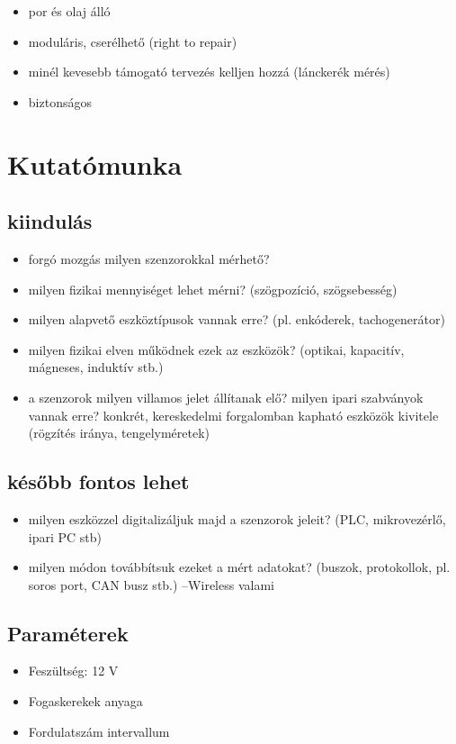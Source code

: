 \documentclass{article}
\begin{document}
	\begin{itemize}
		\item por és olaj álló
		\item moduláris, cserélhető (right to repair)
		\item minél kevesebb támogató tervezés kelljen hozzá (lánckerék mérés)
		\item biztonságos
	\end{itemize}
	
	\section{Kutatómunka}
	\subsection{kiindulás}
	\begin{itemize}
		\item forgó mozgás milyen szenzorokkal mérhető?
		\item milyen fizikai mennyiséget lehet mérni? (szögpozíció, szögsebesség)
		\item milyen alapvető eszköztípusok vannak erre? (pl. enkóderek, tachogenerátor)
		\item milyen fizikai elven működnek ezek az eszközök? (optikai, kapacitív, mágneses, induktív stb.)
		\item a szenzorok milyen villamos jelet állítanak elő? milyen ipari szabványok vannak erre?
		konkrét, kereskedelmi forgalomban kapható eszközök kivitele (rögzítés iránya, tengelyméretek)
	\end{itemize}
	
	\subsection{később fontos lehet}
	\begin{itemize}
		\item milyen eszközzel digitalizáljuk majd a szenzorok jeleit? (PLC, mikrovezérlő, ipari PC stb)
		\item milyen módon továbbítsuk ezeket a mért adatokat? (buszok, protokollok, pl. soros port, CAN busz stb.) --Wireless valami
	\end{itemize}
	
	\subsection{Paraméterek}
	\begin{itemize}
		\item Feszültség: 12 V
		\item Fogaskerekek anyaga
		\item Fordulatszám intervallum
		
	\end{itemize}
	
\end{document}
